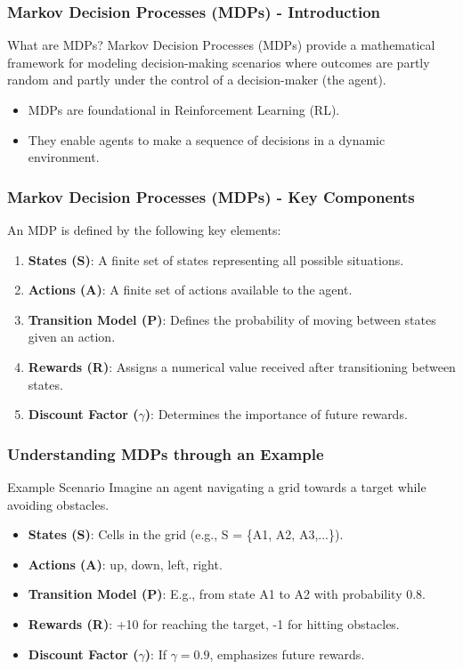 \documentclass[aspectratio=169]{beamer}
\begin{document}
\begin{frame}[fragile]
    \frametitle{Markov Decision Processes (MDPs) - Introduction}
    \begin{block}{What are MDPs?}
        Markov Decision Processes (MDPs) provide a mathematical framework for modeling decision-making scenarios where outcomes are partly random and partly under the control of a decision-maker (the agent). 
    \end{block}
    \begin{itemize}
        \item MDPs are foundational in Reinforcement Learning (RL).
        \item They enable agents to make a sequence of decisions in a dynamic environment.
    \end{itemize}
\end{frame}

\begin{frame}[fragile]
    \frametitle{Markov Decision Processes (MDPs) - Key Components}
    An MDP is defined by the following key elements:
    \begin{enumerate}
        \item \textbf{States (S)}: A finite set of states representing all possible situations.
        \item \textbf{Actions (A)}: A finite set of actions available to the agent.
        \item \textbf{Transition Model (P)}: Defines the probability of moving between states given an action.
        \item \textbf{Rewards (R)}: Assigns a numerical value received after transitioning between states.
        \item \textbf{Discount Factor ($\gamma$)}: Determines the importance of future rewards.
    \end{enumerate}
\end{frame}

\begin{frame}[fragile]
    \frametitle{Understanding MDPs through an Example}
    \begin{block}{Example Scenario}
        Imagine an agent navigating a grid towards a target while avoiding obstacles.
    \end{block}
    \begin{itemize}
        \item \textbf{States (S)}: Cells in the grid (e.g., S = \{A1, A2, A3,...\}).
        \item \textbf{Actions (A)}: {up, down, left, right}.
        \item \textbf{Transition Model (P)}: E.g., from state A1 to A2 with probability 0.8.
        \item \textbf{Rewards (R)}: +10 for reaching the target, -1 for hitting obstacles.
        \item \textbf{Discount Factor ($\gamma$)}: If $\gamma = 0.9$, emphasizes future rewards.
    \end{itemize}
\end{frame}
\end{document}
